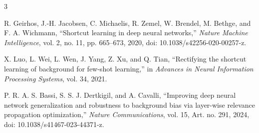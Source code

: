 \documentclass[conference]{IEEEtran}
\begin{document}
\balance
\begin{thebibliography}{3}

R. Geirhos, J.-H. Jacobsen, C. Michaelis, R. Zemel, W. Brendel, M. Bethge, and F. A. Wichmann, ``Shortcut learning in deep neural networks,'' \emph{Nature Machine Intelligence}, vol. 2, no. 11, pp. 665--673, 2020, doi: 10.1038/s42256-020-00257-z.

X. Luo, L. Wei, L. Wen, J. Yang, Z. Xu, and Q. Tian, ``Rectifying the shortcut learning of background for few-shot learning,'' in \emph{Advances in Neural Information Processing Systems}, vol. 34, 2021.

P. R. A. S. Bassi, S. S. J. Dertkigil, and A. Cavalli, ``Improving deep neural network generalization and robustness to background bias via layer-wise relevance propagation optimization,'' \emph{Nature Communications}, vol. 15, Art. no. 291, 2024, doi: 10.1038/s41467-023-44371-z.

\end{thebibliography}
\end{document}

